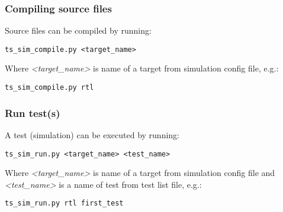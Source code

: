 \documentclass{tropic_design_spec}
\begin{document}
\subsubsection{Compiling source files}
\label{sec:compiling-source-files}

Source files can be compiled by running:

\begin{lstlisting}
ts_sim_compile.py <target_name>
\end{lstlisting}

Where \textit{<target_name>} is name of a target from simulation config file, e.g.:

\begin{lstlisting}
ts_sim_compile.py rtl
\end{lstlisting}



\subsubsection{Run test(s)}
\label{sec:run-tests}

A test (simulation) can be executed by running:

\begin{lstlisting}
ts_sim_run.py <target_name> <test_name>
\end{lstlisting}

Where \textit{<target_name>} is name of a target from simulation config file and
\textit{<test_name>} is a name of test from test list file, e.g.:

\begin{lstlisting}
ts_sim_run.py rtl first_test
\end{lstlisting}



\end{document}
